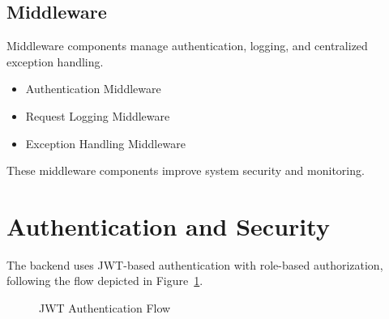 \subsection{Middleware}

Middleware components manage authentication, logging, and centralized exception handling.

\begin{itemize}
    \item Authentication Middleware
    \item Request Logging Middleware
    \item Exception Handling Middleware
\end{itemize}

These middleware components improve system security and monitoring.

\section{Authentication and Security}
\label{sec:backend-security}

The backend uses JWT-based authentication with role-based authorization, following the flow depicted in Figure~\ref{fig:jwt-backend-flow}.

\begin{figure}[H]
\centering


\caption{JWT Authentication Flow}
\label{fig:jwt-backend-flow}

\end{figure}

